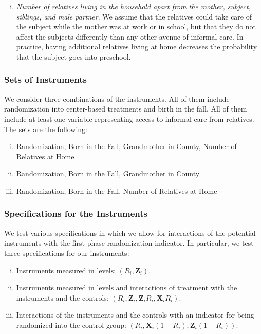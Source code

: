 \begin{appendices}
\begin{enumerate}[(i)]
\item \textit{Number of relatives living in the household apart from the mother, subject, siblings, and male partner}. We assume that the relatives could take care of the subject while the mother was at work or in school, but that they do not affect the subjects differently than any other avenue of informal care. In practice, having additional relatives living at home decreases the probability that the subject goes into preschool.
\end{enumerate}

\subsubsection{Sets of Instruments}
\noindent We consider three combinations of the instruments.  All of them include randomization into center-based treatments and birth in the fall. All of them include at least one variable representing access to informal care from relatives. The sets are the following:
\begin{enumerate}[(i)]
\item Randomization, Born in the Fall, Grandmother in County, Number of Relatives at Home
\item Randomization, Born in the Fall, Grandmother in County
\item Randomization, Born in the Fall, Number of Relatives at Home
\end{enumerate}

\subsubsection{Specifications for the Instruments}
\noindent We test various specifications in which we allow for interactions of the potential instruments with the first-phase randomization indicator. In particular, we test three specifications for our instruments:

\begin{enumerate}[(i)]
\item Instruments measured in levels: $ \left( R_i,\mathbf{Z}_i \right) $.
\item\label{interact} Instruments measured in levels and interactions of treatment with the instruments and the controls: $ \left(R_i,\mathbf{Z}_i,\mathbf{Z}_iR_i,\mathbf{X}_iR_i \right)$.
\item\label{inverse} Interactions of the instruments and the controls with an indicator for being randomized into the control group: $\left( R_i, \mathbf{X}_i \left( 1-R_i \right), \mathbf{Z}_i \left( 1-R_i \right) \right)$.
\end{enumerate}


\end{appendices}
